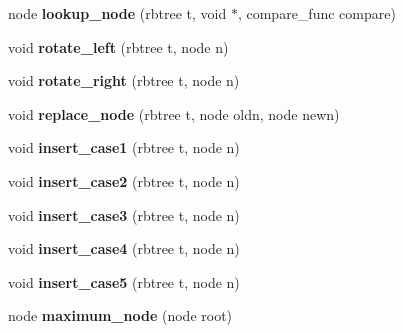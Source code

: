 \begin{DoxyCompactItemize}
\item 
\hypertarget{class_r_b_tree_afddecfdfff6f2963412a704a6e86764b}{}node {\bfseries lookup\+\_\+node} (rbtree t, void $\ast$, compare\+\_\+func compare)\label{class_r_b_tree_afddecfdfff6f2963412a704a6e86764b}

\item 
\hypertarget{class_r_b_tree_a06fca795bda083020075bdca75af2161}{}void {\bfseries rotate\+\_\+left} (rbtree t, node n)\label{class_r_b_tree_a06fca795bda083020075bdca75af2161}

\item 
\hypertarget{class_r_b_tree_ae069d153f85b6db88cea3bcd8144c75e}{}void {\bfseries rotate\+\_\+right} (rbtree t, node n)\label{class_r_b_tree_ae069d153f85b6db88cea3bcd8144c75e}

\item 
\hypertarget{class_r_b_tree_ad7e79eae67ee384b6d104929a437eed2}{}void {\bfseries replace\+\_\+node} (rbtree t, node oldn, node newn)\label{class_r_b_tree_ad7e79eae67ee384b6d104929a437eed2}

\item 
\hypertarget{class_r_b_tree_afc80ca583e442c890dc89ff3d58bb4ef}{}void {\bfseries insert\+\_\+case1} (rbtree t, node n)\label{class_r_b_tree_afc80ca583e442c890dc89ff3d58bb4ef}

\item 
\hypertarget{class_r_b_tree_af4ad17222bbc48e103e2cb458ff874d2}{}void {\bfseries insert\+\_\+case2} (rbtree t, node n)\label{class_r_b_tree_af4ad17222bbc48e103e2cb458ff874d2}

\item 
\hypertarget{class_r_b_tree_aee0e3ea7f0f49056f0e82db394ad8583}{}void {\bfseries insert\+\_\+case3} (rbtree t, node n)\label{class_r_b_tree_aee0e3ea7f0f49056f0e82db394ad8583}

\item 
\hypertarget{class_r_b_tree_aa009f1002c81b4db6363144f03421ba9}{}void {\bfseries insert\+\_\+case4} (rbtree t, node n)\label{class_r_b_tree_aa009f1002c81b4db6363144f03421ba9}

\item 
\hypertarget{class_r_b_tree_ae1f502b5b73b42b5884e047868e44da2}{}void {\bfseries insert\+\_\+case5} (rbtree t, node n)\label{class_r_b_tree_ae1f502b5b73b42b5884e047868e44da2}

\item 
\hypertarget{class_r_b_tree_aff4de6fa03e91db0be183c73f8d8f445}{}node {\bfseries maximum\+\_\+node} (node root)\label{class_r_b_tree_aff4de6fa03e91db0be183c73f8d8f445}


\end{DoxyCompactItemize}
